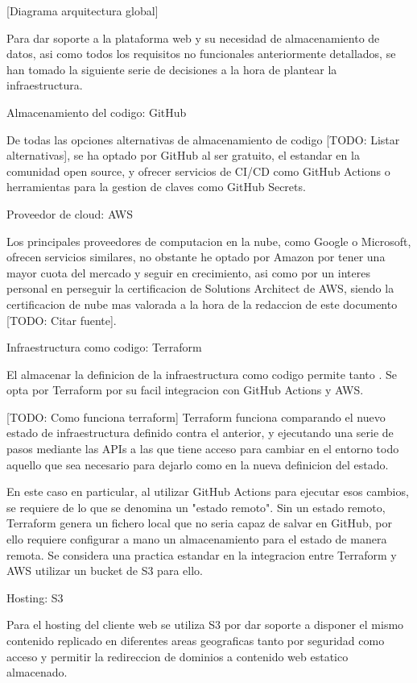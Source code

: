 
[Diagrama arquitectura global]

Para dar soporte a la plataforma web y su necesidad de almacenamiento de datos, asi como todos los requisitos no funcionales anteriormente detallados, se han tomado la siguiente serie de decisiones a la hora de plantear la infraestructura.

Almacenamiento del codigo: GitHub

De todas las opciones alternativas de almacenamiento de codigo [TODO: Listar alternativas], se ha optado por GitHub al ser gratuito, el estandar en la comunidad open source, y ofrecer servicios de CI/CD como GitHub Actions o herramientas para la gestion de claves como GitHub Secrets.

Proveedor de cloud: AWS

Los principales proveedores de computacion en la nube, como Google o Microsoft, ofrecen servicios similares, no obstante he optado por Amazon por tener una mayor cuota del mercado y seguir en crecimiento, asi como por un interes personal en perseguir la certificacion de Solutions Architect de AWS, siendo la certificacion de nube mas valorada a la hora de la redaccion de este documento [TODO: Citar fuente].

Infraestructura como codigo: Terraform

El almacenar la definicion de la infraestructura como codigo permite tanto  \cite{InfraAsCode}. Se opta por Terraform por su facil integracion con GitHub Actions y AWS.

[TODO: Como funciona terraform]
Terraform funciona comparando el nuevo estado de infraestructura definido contra el anterior, y ejecutando una serie de pasos mediante las APIs a las que tiene acceso para cambiar en el entorno todo aquello que sea necesario para dejarlo como en la nueva definicion del estado.

En este caso en particular, al utilizar GitHub Actions para ejecutar esos cambios, se requiere de lo que se denomina un "estado remoto". Sin un estado remoto, Terraform genera un fichero local que no seria capaz de salvar en GitHub, por ello requiere configurar a mano un almacenamiento para el estado de manera remota. Se considera una practica estandar en la integracion entre Terraform y AWS utilizar un bucket de S3 para ello.

Hosting: S3

Para el hosting del cliente web se utiliza S3 por dar soporte a disponer el mismo contenido replicado en diferentes areas geograficas tanto por seguridad como acceso y permitir la redireccion de dominios a contenido web estatico almacenado.

